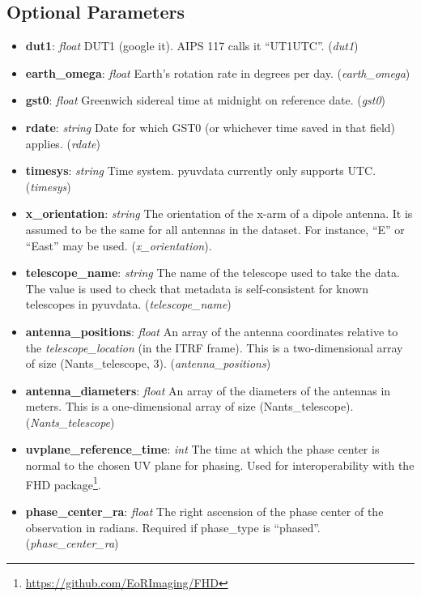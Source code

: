 \documentclass[11pt, oneside]{article}
\begin{document}
\subsection{Optional Parameters}
\label{sec:opt_params}
\begin{itemize}
\item \textbf{dut1}: \textit{float} DUT1 (google it). AIPS 117 calls it
  ``UT1UTC''. (\textit{dut1})
\item \textbf{earth\_omega}: \textit{float} Earth's rotation rate in degrees per
  day. (\textit{earth\_omega})
\item \textbf{gst0}: \textit{float} Greenwich sidereal time at midnight on
  reference date. (\textit{gst0})
\item \textbf{rdate}: \textit{string} Date for which GST0 (or whichever time
  saved in that field) applies. (\textit{rdate})
\item \textbf{timesys}: \textit{string} Time system. pyuvdata currently only
  supports UTC. (\textit{timesys})
\item \textbf{x\_orientation}: \textit{string} The orientation of the x-arm of a
  dipole antenna. It is assumed to be the same for all antennas in the
  dataset. For instance, ``E'' or ``East'' may be
  used. (\textit{x\_orientation}).
\item \textbf{telescope\_name}: \textit{string} The name of the telescope used
  to take the data. The value is used to check that metadata is self-consistent
  for known telescopes in pyuvdata. (\textit{telescope\_name})
\item \textbf{antenna\_positions}: \textit{float} An array of the antenna
  coordinates relative to the \textit{telescope\_location} (in the ITRF
  frame). This is a two-dimensional array of size (Nants\_telescope,
  3). (\textit{antenna\_positions})
\item \textbf{antenna\_diameters}: \textit{float} An array of the diameters of
  the antennas in meters. This is a one-dimensional array of size
  (Nants\_telescope). (\textit{Nants\_telescope})
\item \textbf{uvplane\_reference\_time}: \textit{int} The time at which the
  phase center is normal to the chosen UV plane for phasing. Used for
  interoperability with the FHD
  package\footnote{\url{https://github.com/EoRImaging/FHD}}.
\item \textbf{phase\_center\_ra}: \textit{float} The right ascension of the
  phase center of the observation in radians. Required if phase\_type is
  ``phased''. (\textit{phase\_center\_ra})

\end{itemize}
\end{document}

